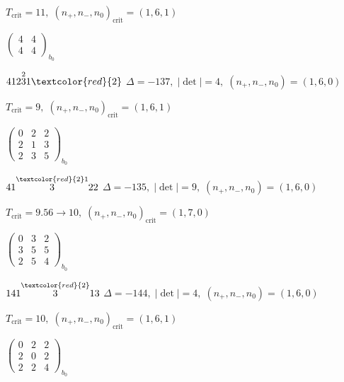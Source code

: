 \documentclass[10pt]{article}
\begin{document}
\hspace{1em}$T_{\text{crit}}=11,\; (n_+,n_-,n_0)_{\text{crit}}=(1,6,1)$

\hspace{2em}$\left(\begin{smallmatrix}4 & 4 \\ 4 & 4\end{smallmatrix}\right)_{\!b_0}$

$412\overset{2}{3}1\textcolor{red}{2}$ \quad $\Delta=-137,\; |\det|=4,\; (n_+,n_-,n_0)=(1,6,0)$

\hspace{1em}$T_{\text{crit}}=9,\; (n_+,n_-,n_0)_{\text{crit}}=(1,6,1)$

\hspace{2em}$\left(\begin{smallmatrix}0 & 2 & 2 \\ 2 & 1 & 3 \\ 2 & 3 & 5\end{smallmatrix}\right)_{\!b_0}$

\smallskip

$41\overset{\textcolor{red}{2}1}{3}22$ \quad $\Delta=-135,\; |\det|=9,\; (n_+,n_-,n_0)=(1,6,0)$

\hspace{1em}$T_{\text{crit}}=9.56 \to 10,\; (n_+,n_-,n_0)_{\text{crit}}=(1,7,0)$

\hspace{2em}$\left(\begin{smallmatrix}0 & 3 & 2 \\ 3 & 5 & 5 \\ 2 & 5 & 4\end{smallmatrix}\right)_{\!b_0}$

\smallskip

$141\overset{\textcolor{red}{2}}{3}13$ \quad $\Delta=-144,\; |\det|=4,\; (n_+,n_-,n_0)=(1,6,0)$

\hspace{1em}$T_{\text{crit}}=10,\; (n_+,n_-,n_0)_{\text{crit}}=(1,6,1)$

\hspace{2em}$\left(\begin{smallmatrix}0 & 2 & 2 \\ 2 & 0 & 2 \\ 2 & 2 & 4\end{smallmatrix}\right)_{\!b_0}$

\smallskip
\end{document}
